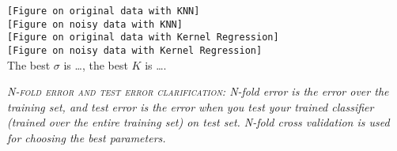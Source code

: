 \begin{itemize}
 {\tt  [Figure on original data with KNN]}
 \\    
 
 {\tt [Figure on noisy data with KNN]}
 \\

  {\tt  [Figure on original data with Kernel Regression]}
 \\    
 
  {\tt  [Figure on noisy data with Kernel Regression]}
 \\    
 
 The best $\sigma$ is  \ldots, the best $K$ is \ldots  .

  
 \emph{\textsc{N-fold error and test error clarification:} N-fold error is the error over the training set, and test error is the error when you test your trained classifier (trained over the entire training set) on test set. N-fold cross validation is used for choosing the best parameters. }

\end{itemize}

